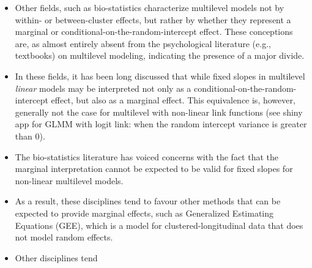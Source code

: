 
\begin{itemize}
    \item Other fields, such as bio-statistics characterize multilevel models not by within- or between-cluster effects, but rather by whether they represent a marginal or conditional-on-the-random-intercept effect. These conceptions are, as almost entirely absent from the psychological literature (e.g., textbooks) on multilevel modeling, indicating the presence of a major divide.
    \item In these fields, it has been long discussed that while fixed slopes in multilevel \textit\textit{linear} models may be interpreted not only as a conditional-on-the-random-intercept effect, but also as a marginal effect. This equivalence is, however, generally not the case for multilevel with non-linear link functions (see shiny app for GLMM with logit link: when the random intercept variance is greater than 0). 
    \item The bio-statistics literature has voiced concerns with the fact that the marginal interpretation cannot be expected to be valid for fixed slopes for non-linear multilevel models. 
    \item As a result, these disciplines tend to favour other methods that can be expected to provide marginal effects, such as Generalized Estimating Equations (GEE), which is a model for clustered-longitudinal data that does not model random effects.
    \item Other disciplines tend
\end{itemize}



